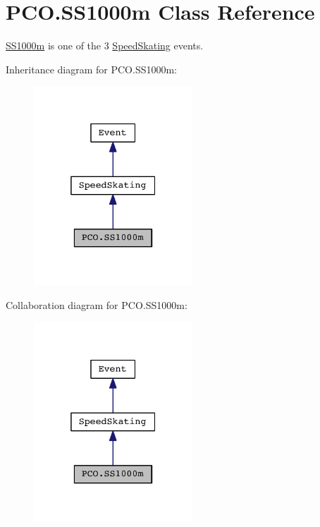 \hypertarget{classPCO_1_1SS1000m}{\section{P\+C\+O.\+S\+S1000m Class Reference}
\label{classPCO_1_1SS1000m}
}


\hyperlink{classPCO_1_1SS1000m}{S\+S1000m} is one of the 3 \hyperlink{classPCO_1_1SpeedSkating}{Speed\+Skating} events.  




Inheritance diagram for P\+C\+O.\+S\+S1000m\+:\nopagebreak
\begin{figure}[H]
\begin{center}
\leavevmode
\includegraphics[width=169pt]{classPCO_1_1SS1000m__inherit__graph}
\end{center}
\end{figure}


Collaboration diagram for P\+C\+O.\+S\+S1000m\+:\nopagebreak
\begin{figure}[H]
\begin{center}
\leavevmode
\includegraphics[width=169pt]{classPCO_1_1SS1000m__coll__graph}
\end{center}
\end{figure}
